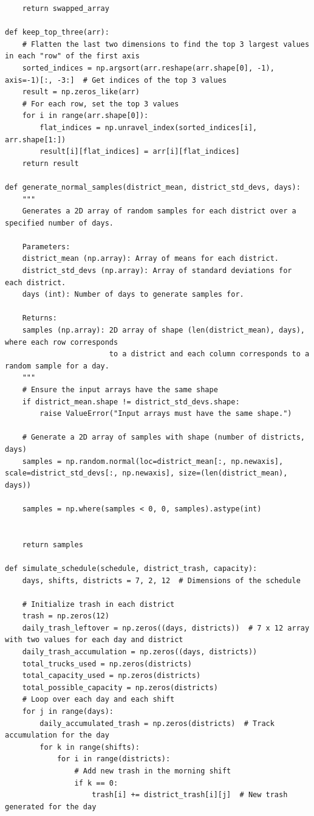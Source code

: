 \documentclass{article}
\begin{document}
\begin{verbatim}
    return swapped_array

def keep_top_three(arr):
    # Flatten the last two dimensions to find the top 3 largest values in each "row" of the first axis
    sorted_indices = np.argsort(arr.reshape(arr.shape[0], -1), axis=-1)[:, -3:]  # Get indices of the top 3 values
    result = np.zeros_like(arr)
    # For each row, set the top 3 values
    for i in range(arr.shape[0]):
        flat_indices = np.unravel_index(sorted_indices[i], arr.shape[1:])
        result[i][flat_indices] = arr[i][flat_indices]
    return result

def generate_normal_samples(district_mean, district_std_devs, days):
    """
    Generates a 2D array of random samples for each district over a specified number of days.
    
    Parameters:
    district_mean (np.array): Array of means for each district.
    district_std_devs (np.array): Array of standard deviations for each district.
    days (int): Number of days to generate samples for.
    
    Returns:
    samples (np.array): 2D array of shape (len(district_mean), days), where each row corresponds
                        to a district and each column corresponds to a random sample for a day.
    """
    # Ensure the input arrays have the same shape
    if district_mean.shape != district_std_devs.shape:
        raise ValueError("Input arrays must have the same shape.")
    
    # Generate a 2D array of samples with shape (number of districts, days)
    samples = np.random.normal(loc=district_mean[:, np.newaxis], scale=district_std_devs[:, np.newaxis], size=(len(district_mean), days))

    samples = np.where(samples < 0, 0, samples).astype(int)

    
    return samples

def simulate_schedule(schedule, district_trash, capacity):
    days, shifts, districts = 7, 2, 12  # Dimensions of the schedule
    
    # Initialize trash in each district
    trash = np.zeros(12)
    daily_trash_leftover = np.zeros((days, districts))  # 7 x 12 array with two values for each day and district
    daily_trash_accumulation = np.zeros((days, districts))
    total_trucks_used = np.zeros(districts)
    total_capacity_used = np.zeros(districts)
    total_possible_capacity = np.zeros(districts)
    # Loop over each day and each shift
    for j in range(days):
        daily_accumulated_trash = np.zeros(districts)  # Track accumulation for the day
        for k in range(shifts):
            for i in range(districts):
                # Add new trash in the morning shift
                if k == 0:
                    trash[i] += district_trash[i][j]  # New trash generated for the day
                

\end{verbatim}
\end{document}
